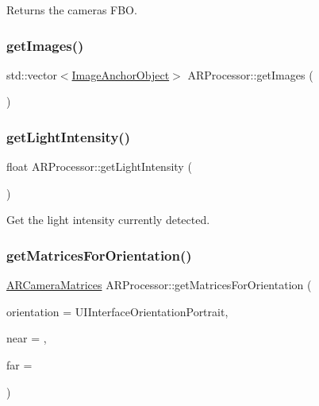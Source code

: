 Returns the camera\textquotesingle{}s F\+BO. 

\mbox{\label{class_a_r_processor_aa21d943bcd4020fe98d7c9d1a9f14844}} 
\subsubsection{\texorpdfstring{get\+Images()}{getImages()}}
{\footnotesize\ttfamily std\+::vector$<$\mbox{\hyperlink{struct_a_r_objects_1_1_image_anchor_object}{Image\+Anchor\+Object}}$>$ A\+R\+Processor\+::get\+Images (\begin{DoxyParamCaption}{ }\end{DoxyParamCaption})\hspace{0.3cm}{\ttfamily [inline]}}

\mbox{\label{class_a_r_processor_a3e6d897db3a54b004f3eac337110765e}} 
\subsubsection{\texorpdfstring{get\+Light\+Intensity()}{getLightIntensity()}}
{\footnotesize\ttfamily float A\+R\+Processor\+::get\+Light\+Intensity (\begin{DoxyParamCaption}{ }\end{DoxyParamCaption})}



Get the light intensity currently detected. 

\mbox{\label{class_a_r_processor_abcd684d805e880aed72c2eb56a65978f}} 
\subsubsection{\texorpdfstring{get\+Matrices\+For\+Orientation()}{getMatricesForOrientation()}}
{\footnotesize\ttfamily \mbox{\hyperlink{struct_a_r_common_1_1_a_r_camera_matrices}{A\+R\+Camera\+Matrices}} A\+R\+Processor\+::get\+Matrices\+For\+Orientation (\begin{DoxyParamCaption}\item[{U\+I\+Interface\+Orientation}]{orientation = {\ttfamily UIInterfaceOrientationPortrait},  }\item[{float}]{near = {},  }\item[{float}]{far = {} }\end{DoxyParamCaption})}



